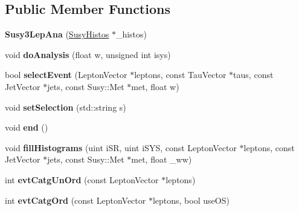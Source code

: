 \subsection*{Public Member Functions}
\begin{DoxyCompactItemize}
\item 
\hypertarget{classSusy3LepAna_af58b46d32a1d7807474b2d39e3185965}{
{\bfseries Susy3LepAna} (\hyperlink{classSusyHistos}{SusyHistos} $\ast$\_\-histos)}
\label{classSusy3LepAna_af58b46d32a1d7807474b2d39e3185965}

\item 
\hypertarget{classSusy3LepAna_a064dde13f4c15d9cfe13c3fdb55c7948}{
void {\bfseries doAnalysis} (float w, unsigned int isys)}
\label{classSusy3LepAna_a064dde13f4c15d9cfe13c3fdb55c7948}

\item 
\hypertarget{classSusy3LepAna_ae76031474c2b58200b9afc3f4fedc3e2}{
bool {\bfseries selectEvent} (LeptonVector $\ast$leptons, const TauVector $\ast$taus, const JetVector $\ast$jets, const Susy::Met $\ast$met, float w)}
\label{classSusy3LepAna_ae76031474c2b58200b9afc3f4fedc3e2}

\item 
\hypertarget{classSusy3LepAna_adc0ca250af87072b6209a244a60fa201}{
void {\bfseries setSelection} (std::string s)}
\label{classSusy3LepAna_adc0ca250af87072b6209a244a60fa201}

\item 
\hypertarget{classSusy3LepAna_a01eebce66c9961fc9aa3c48e29ee5666}{
void {\bfseries end} ()}
\label{classSusy3LepAna_a01eebce66c9961fc9aa3c48e29ee5666}

\item 
\hypertarget{classSusy3LepAna_a3d3223ba50e7dd182a0806191623115e}{
void {\bfseries fillHistograms} (uint iSR, uint iSYS, const LeptonVector $\ast$leptons, const JetVector $\ast$jets, const Susy::Met $\ast$met, float \_\-ww)}
\label{classSusy3LepAna_a3d3223ba50e7dd182a0806191623115e}

\item 
\hypertarget{classSusy3LepAna_adb2dde7ccb257b40d8148614db8e1533}{
int {\bfseries evtCatgUnOrd} (const LeptonVector $\ast$leptons)}
\label{classSusy3LepAna_adb2dde7ccb257b40d8148614db8e1533}

\item 
\hypertarget{classSusy3LepAna_a73adef000977472c81ca4d683d09697a}{
int {\bfseries evtCatgOrd} (const LeptonVector $\ast$leptons, bool useOS)}
\label{classSusy3LepAna_a73adef000977472c81ca4d683d09697a}


\end{DoxyCompactItemize}
